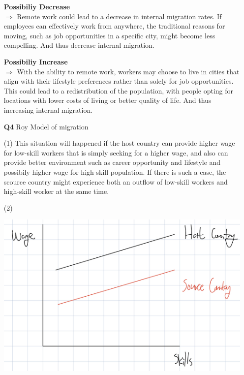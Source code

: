 \documentclass[12pt]{article}
\begin{document}
\begin{enumerate}
    \textbf{Possibiliy Decrease} \\$\Rightarrow$ Remote work could lead to a decrease in internal migration rates. 
    If employees can effectively work from anywhere, the traditional reasons for moving, such as job opportunities in a specific city, 
    might become less compelling. And thus decrease internal migration.

    \textbf{Possibiliy Increase} \\$\Rightarrow$ With the ability to remote work, 
    workers may choose to live in cities that align with their lifestyle preferences rather than solely for job opportunities. 
    This could lead to a redistribution of the population, with people opting for locations with lower costs of living or better quality of life.
    And thus increasing internal migration.

    \item [\textbf{Q4}] Roy Model of migration
    
    (1) This situation will happened if the host country can provide higher wage for 
    low-skill workers that is simply seeking for a higher wage, and also can provide better environment such as career opportunity and lifestyle and possibily higher wage for high-skill population. 
    If there is such a case, the scource country might experience both an outflow of low-skill workers and high-skill worker at the same time.\newpage

    (2)

    \includegraphics[width=1\linewidth]{hw3_img5.jpeg}


\end{enumerate}
\end{document}

